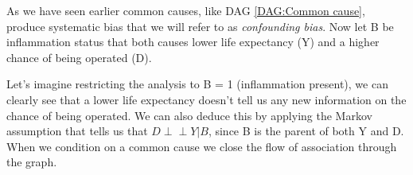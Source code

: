As we have seen earlier common causes, like DAG \ref{DAG:Common cause}, produce systematic bias that we will refer to as \textit{confounding bias}. Now let B be inflammation status that both causes lower life expectancy (Y) and a higher chance of being operated (D). 
\begin{figure}[H]
	\centering
\end{figure}
Let's imagine restricting the analysis to B = 1 (inflammation present), we can clearly see that a lower life expectancy doesn't tell us any new information on the chance of being operated. 
We can also deduce this by applying the Markov assumption that tells us that $D \perp\!\!\!\perp Y|B$, since B is the parent of both Y and D. When we condition on a common cause we close the flow of association through the graph.
%

